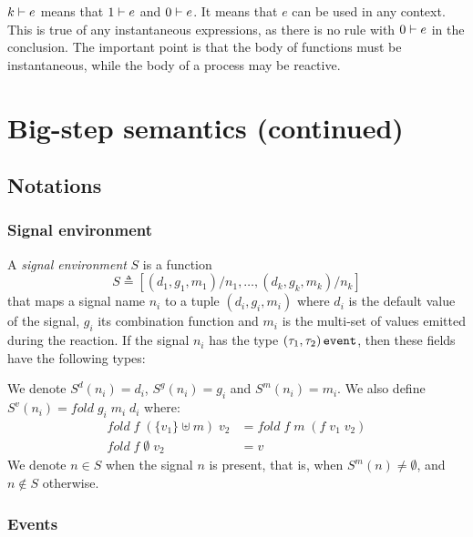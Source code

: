 \documentclass[9pt,preprint]{sigplanconf}
\newcommand{\deq}{\triangleq}
\begin{document}
$k \vdash e$ means that $1 \vdash e$ and $0 \vdash e$. It means that $e$ can be used in any context. This is true of any instantaneous expressions, as there is no rule with $0 \vdash e$ in the conclusion. The important point is that the body of functions must be instantaneous, while the body of a process may be reactive.


\section{Big-step semantics (continued)}
\label{sec:big_step_other}

\subsection{Notations}

\subsubsection*{Signal environment}

 A \emph{signal environment} $S$ is a function
\[ S \deq [ (d_1, g_1, m_1)/n_1, \dots, (d_k, g_k, m_k)/n_k ] \] 
that maps a signal name $n_i$ to a tuple $(d_i, g_i, m_i)$ where $d_i$ is the default value of the signal, $g_i$ its combination function and $m_i$ is the multi-set of values emitted during the reaction. If the signal $n_i$ has the type $(\tau_1, \tau_2) \,\mathtt{event}$, then these fields have the following types:
We denote $S^d(n_i) = d_i$, $S^g(n_i) = g_i$ and $S^m(n_i) = m_i$. We also define $S^v(n_i) = \mathit{fold}\; g_i\; m_i\; d_i$ where:
\begin{align*}
\mathit{fold}\; f\; (\{ v_1 \} \uplus m)\; v_2 &= \mathit{fold}\; f\; m\; (f\; v_1\; v_2) \\
\mathit{fold}\; f\; \emptyset\; v_2 &= v
\end{align*}
We denote $n \in S$ when the signal $n$ is present, that is, when $S^m(n) \neq \emptyset$, and $n \not\in S$ otherwise.

\subsubsection*{Events}
\end{document}
